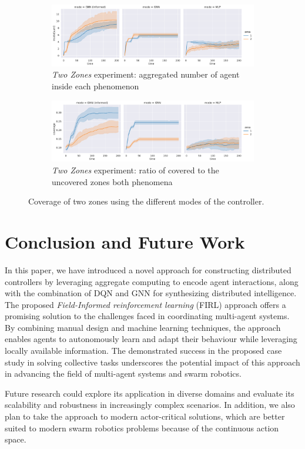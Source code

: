 \begin{figure}
	\centering
  	\begin{subfigure}[b]{0.85\linewidth}
    \includegraphics[width=\linewidth]{papers/acsos2023/imgs/inside-two-test}
    \caption{\emph{Two Zones} experiment: aggregated number of agent inside each phenomenon}
    \label{fig:inside-two-test}
  \end{subfigure}
  \begin{subfigure}[b]{0.85\linewidth}
    \includegraphics[width=\linewidth]{papers/acsos2023/imgs/coverage-two-test}
    \caption{\emph{Two Zones} experiment: ratio of covered to the uncovered zones both phenomena}
    \label{fig:coverage-two-test}
  \end{subfigure} 
  \caption{Coverage of two zones using the different modes of the controller.}
  \label{fig:resCoverage}
\end{figure}
 
\section{Conclusion and Future Work}
In this paper, 
 we have introduced a novel approach for constructing distributed controllers by leveraging aggregate computing to encode agent interactions, 
 along with the combination of \ac{DQN} and \ac{GNN} for synthesizing distributed intelligence.
The proposed \emph{Field-Informed reinforcement learning} (FIRL) approach offers a promising solution to the challenges faced in coordinating multi-agent systems. 
By combining manual design and machine learning techniques, 
 the approach enables agents to autonomously learn and adapt their behaviour while leveraging locally available information. 
%
The demonstrated success in the proposed case study in solving collective tasks underscores the potential impact of this approach in advancing the field of multi-agent systems and swarm robotics. 

Future research could explore its application in diverse domains and evaluate its scalability and robustness in increasingly complex scenarios. 
%
In addition, we also plan to take the approach to modern actor-critical solutions, which are better suited to modern swarm robotics problems because of the continuous action space.
\label{sec:conclusion}

\printbibliography